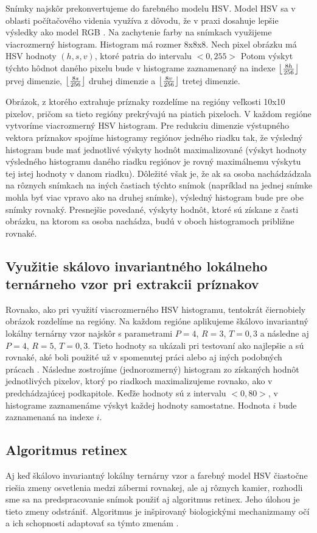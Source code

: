 Snímky najskôr prekonvertujeme do farebného modelu HSV.
Model HSV sa v oblasti počítačového videnia využíva z dôvodu, že v praxi dosahuje lepšie výsledky ako model RGB \cite{RGBHSV}.
Na zachytenie farby na snímkach využijeme viacrozmerný histogram.
Histogram má rozmer 8x8x8.
Nech pixel obrázku má HSV hodnoty $(h,s,v)$, ktoré patria do intervalu $<0, 255>$
Potom výskyt týchto hôdnot daného pixelu bude v histograme zaznamenaný na indexe $\left\lfloor \frac{8h}{256} \right\rfloor$ prvej dimenzie, $\left\lfloor \frac{8s}{256} \right\rfloor$ druhej dimenzie a $\left\lfloor \frac{8v}{256} \right\rfloor$ tretej dimenzie.


Obrázok, z ktorého extrahuje príznaky rozdelíme na regióny veľkosti 10x10 pixelov, pričom sa tieto regióny prekrývajú na piatich pixeloch.
V každom regióne vytvoríme viacrozmerný HSV histogram.
Pre redukciu dimenzie výstupného vektora príznakov spojíme histogramy regiónov jedného riadku tak, že výsledný histogram bude mať jednotlivé výskyty hodnôt maximalizované (výskyt hodnoty výsledného histogramu daného riadku regiónov je rovný maximálnemu výskytu tej istej hodnoty v danom riadku).
Dôležité však je, že ak sa osoba nachádzádzala na rôznych snímkach na iných častiach týchto snímok (napríklad na jednej snímke mohla byť viac vpravo ako na druhej snímke), výsledný histogram bude pre obe snímky rovnaký. 
Presnejšie povedané, výskyty hodnôt, ktoré sú získane z časti obrázku, na ktorom sa osoba nachádza, budú v oboch histogramoch približne rovnaké.

\subsection{Využitie skálovo invariantného lokálneho ternárneho vzor pri extrakcii príznakov}
Rovnako, ako pri využití viacrozmerného HSV histogramu, tentokrát čiernobiely obrázok rozdelíme na regióny.
Na každom regióne aplikujeme škálovo invariantný lokálny ternárny vzor najskôr s parametrami $P=4$, $R=3$, $T=0,3$ a následne aj $P=4$, $R=5$, $T=0,3$. 
Tieto hodnoty sa ukázali pri testovaní ako najlepšie a sú rovnaké, aké boli použité už v spomenutej práci alebo aj iných podobných prácach \cite{featuresinspiration}.
Následne zostrojíme (jednorozmerný) histogram zo získaných hodnôt jednotlivých pixelov, ktorý po riadkoch maximalizujeme rovnako, ako v predchádzajúcej podkapitole.
Keďže hodnoty sú z intervalu $<0, 80>$, v histograme zaznamenáme výskyt každej hodnoty samostatne.
Hodnota $i$ bude zaznamenaná na indexe $i$.


\subsection{Algoritmus retinex}
Aj keď škálovo invariantný lokálny ternárny vzor a farebný model HSV čiastočne riešia zmeny osvetlenia medzi zábermi rovnakej, ale aj rôznych kamier, rozhodli sme sa na predspracovanie snímok použiť aj algoritmus retinex.
Jeho úlohou je tieto zmeny odstrániť.
Algoritmus je inšpirovaný biologickými mechanizmamy očí a ich schopnosti adaptovať sa týmto zmenám \cite{retinex}.

